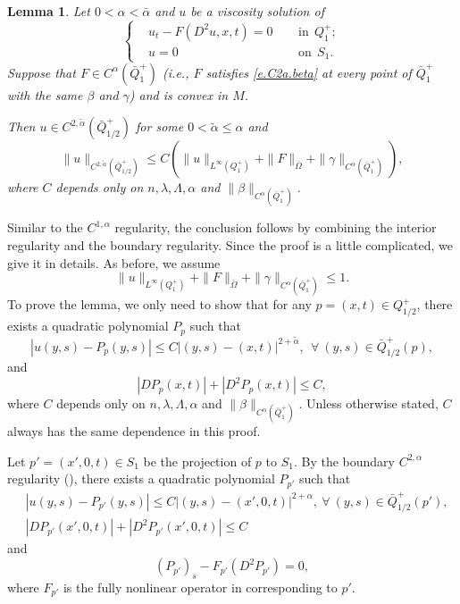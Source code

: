 \documentclass[preprint,12pt]{elsarticle}
\newtheorem{lemma}[theorem]{Lemma}
\theoremstyle{definition}
\theoremstyle{remark}
\numberwithin{equation}{section}
\begin{document}
\begin{lemma}\label{L.C2a.bar}
Let $0<\alpha<\bar\alpha$ and $u$ be a viscosity solution of
\begin{equation*}
\left\{\begin{aligned}
&u_t-F(D^2u,x,t)=0&& ~~\mbox{in}~~Q_1^+;\\
&u=0&& ~~\mbox{on}~~S_1.
\end{aligned}\right.
\end{equation*}
Suppose that $F\in C^{\alpha}(\bar{Q}_1^+)$ (i.e., $F$ satisfies \cref{e.C2a.beta} at every point of $\bar{Q}_1^+$ with the same $\beta$ and $\gamma$) and is convex in $M$.

Then $u\in C^{2,\tilde\alpha}(\bar{Q}^+_{1/2})$ for some $0<\tilde{\alpha}\leq \alpha$ and
\begin{equation*}
 \|u\|_{C^{2,\tilde\alpha}(\bar{Q}^+_{1/2})}\leq C \left(\|u\|_{L^{\infty }(Q_1^+)}+\|F\|_{\bar{\Omega}}+\|\gamma\|_{C^{\alpha}(\bar Q^+_1)}\right),
\end{equation*}
where $C$ depends only on $n,\lambda, \Lambda, \alpha$ and $\|\beta\|_{C^{\alpha}(\bar Q^+_1)}$.
\end{lemma}

\proof Similar to the $C^{1,\alpha}$ regularity, the conclusion follows by combining the interior regularity and the boundary regularity. Since the proof is a little complicated, we give it in details. As before, we assume
\begin{equation*}
\|u\|_{L^{\infty }(Q_1^+)}+\|F\|_{\bar{\Omega}}+\|\gamma\|_{C^{\alpha}(\bar Q^+_1)}\leq 1.
\end{equation*}
To prove the lemma, we only need to show that for any $p=(x,t)\in Q^+_{1/2}$, there exists a quadratic polynomial $P_p$ such that
\begin{equation}\label{e.l61-3}
  |u(y,s)-P_p(y,s)|\leq C|(y,s)-(x,t)|^{2+\tilde \alpha},~~\forall ~(y,s)\in \bar{Q}^+_{1/2}(p),
\end{equation}
and
\begin{equation}\label{e.glo.p}
  |D P_{p}(x,t)|+|D^2 P_{p}(x,t)|\leq C,
\end{equation}
where $C$ depends only on $n,\lambda, \Lambda,\alpha$ and $\|\beta\|_{C^{\alpha}(\bar{Q}^+_1)}$. Unless otherwise stated, $C$ always has the same dependence in this proof.

Let $p'=(x',0,t)\in S_1$ be the projection of $p$ to $S_1$. By the boundary $C^{2,\alpha}$ regularity (), there exists a quadratic polynomial $P_{p'}$ such that
\begin{equation}\label{e4.1}
  \begin{aligned}
    &|u(y,s)-P_{p'}(y,s)|\leq C|(y,s)-(x',0,t)|^{2+\alpha}, ~\forall ~(y,s)\in \bar{Q}_{1/2}^{+}(p'),\\
    &|D P_{p'}(x',0,t)|+|D^2 P_{p'}(x',0,t)|\leq C
  \end{aligned}
\end{equation}
and
\begin{equation}\label{e4.2}
  (P_{p'})_s-F_{p'}(D^2 P_{p'})=0,
\end{equation}
where $F_{p'}$ is the fully nonlinear operator in  corresponding to $p'$.
\end{document}
